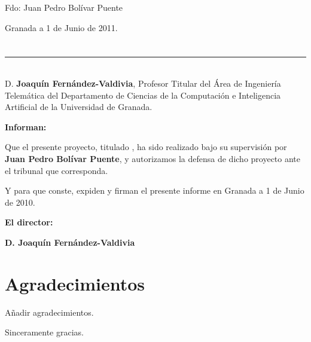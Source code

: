 \vspace{6cm}
\noindent Fdo: Juan Pedro Bolívar Puente

\vspace{2cm}

\begin{flushright}
Granada a 1 de Junio de 2011.
\end{flushright}


\chapter*{}
\thispagestyle{empty}

\noindent\rule[-1ex]{\textwidth}{2pt}\\[4.5ex]

D. \textbf{Joaquín Fernández-Valdivia}, Profesor Titular del Área de
Ingeniería Telemática del Departamento de Ciencias de la Computación e
Inteligencia Artificial de la Universidad de Granada. 
\vspace{0.5cm}


\textbf{Informan:}
\vspace{0.5cm}

Que el presente proyecto, titulado \textit{\textbf{\myTitle}}, ha sido
realizado bajo su supervisión por \textbf{Juan Pedro Bolívar Puente}, y
autorizamos la defensa de dicho proyecto ante el tribunal que
corresponda.
\vspace{0.5cm}

Y para que conste, expiden y firman el presente informe en Granada a 1
de Junio de 2010.
\vspace{1cm}

\textbf{El director:}
\vspace{5cm}

\noindent 
\textbf{D. Joaquín Fernández-Valdivia}%

\chapter*{Agradecimientos}
\thispagestyle{empty}
\vspace{1cm}
\begin{todo}
 Añadir agradecimientos.
\end{todo}


\vspace{3cm}
\noindent Sinceramente gracias.

